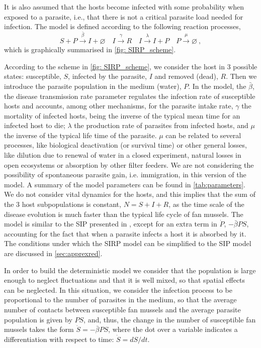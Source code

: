 It is also assumed that the hosts become infected with some probability when
exposed to a parasite, i.e., that there is not a critical parasite load needed
for infection.
The model is defined according to the following reaction processes,
\begin{equation}\label{eq:scheme_reinfection}
    S+P \stackrel{\bar{\beta}}{\rightarrow} I + \varnothing \quad I
    \stackrel{\gamma}{\rightarrow} R \quad I \stackrel{\lambda}{\rightarrow}
    I+P
    \quad P \stackrel{\mu}{\rightarrow} \varnothing \ ,
\end{equation}
which is graphically summarised in \cref{fig: SIRP_scheme}.

According to the scheme in \cref{fig: SIRP_scheme}, we consider the host in 3
possible states: susceptible, $S$, infected by the parasite, $I$ and removed
(dead), $R$. Then we introduce the parasite population in the medium (water),
$P$. In the model, the $\bar{\beta}$, the disease transmission rate parameter
regulates the infection rate of susceptible hosts and accounts, among other
mechanisms, for the parasite intake rate,
$\gamma$ the mortality of infected hosts, being the inverse of the typical mean
time for an infected host to die; $\lambda$ the production rate of parasites
from infected hosts, and $\mu$ the inverse of the typical life time of the
parasite. $\mu$ can be related to several processes, like biological
deactivation (or survival time) or other general losses, like dilution due to
renewal of water in a closed experiment, natural losses in open ecosystems or
absorption by other filter feeders.
We are not considering the possibility of spontaneous parasite gain, i.e.
immigration, in this version of the model. A summary of the model parameters
can be found in \cref{tab:parameters}.
We do not consider vital dynamics for the hosts, and this implies that the sum
of the $3$ host subpopulations is constant, $N=S+I+R$, as the time scale of the
disease evolution is much faster than the typical life cycle of fan mussels.
The model is similar to the SIP presented in \cite{article_SIP}, except for an
extra term in $\dot{P}$, $-\bar{\beta}PS$, accounting for the fact that when a
parasite infects a host it is absorbed by it. The conditions under which the
SIRP model can be simplified to the SIP model are discussed in
\cref{sec:apprexred}.

In order to build the deterministic model we consider that the population
is large enough to neglect fluctuations and that it is well mixed, so that
spatial effects can be neglected.
In this situation, we consider the infection process to be proportional to
the number of parasites in the medium, so that the average number of contacts
between susceptible fan mussels and the average parasite population is given by
$PS$, and, thus, the change in the number of susceptible fan mussels takes the
form $\dot{S}=-\bar{\beta} PS$,  where the dot over a variable indicates a
differentiation with respect to time: $\dot{S}=dS/dt$.


